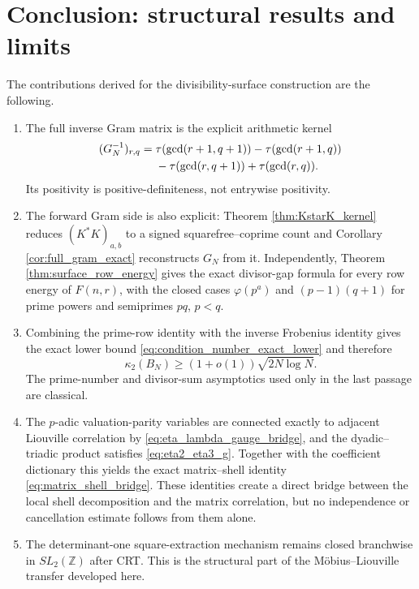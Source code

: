 \documentclass[11pt]{amsart}
\numberwithin{equation}{section}
\theoremstyle{plain}
\theoremstyle{definition}
\theoremstyle{remark}
\newcommand{\Z}{\mathbb Z}
\begin{document}
\section{Conclusion: structural results and limits}
\label{sec:conclusion}

The contributions derived for the divisibility-surface construction are the following.
\begin{enumerate}[label=(\roman*)]
\item The full inverse Gram matrix is the explicit arithmetic kernel
\begin{align}
(G_N^{-1})_{r,q}
={}&\tau(\gcd(r+1,q+1))-\tau(\gcd(r+1,q))\notag\\
&-\tau(\gcd(r,q+1))+\tau(\gcd(r,q)).
\label{eq:conclusion_gram_gcd}
\end{align}
Its positivity is positive-definiteness, not entrywise positivity.

\item The forward Gram side is also explicit: Theorem \ref{thm:KstarK_kernel} reduces $(K^*K)_{a,b}$ to a signed squarefree--coprime count and Corollary \ref{cor:full_gram_exact} reconstructs $G_N$ from it.  Independently, Theorem \ref{thm:surface_row_energy} gives the exact divisor-gap formula for every row energy of $F(n,r)$, with the closed cases $\varphi(p^a)$ and $(p-1)(q+1)$ for prime powers and semiprimes $pq$, $p<q$.

\item Combining the prime-row identity with the inverse Frobenius identity gives the exact lower bound \eqref{eq:condition_number_exact_lower} and therefore
\begin{equation}
\kappa_2(B_N)\ge(1+o(1))\sqrt{2N\log N}.
\label{eq:conclusion_condition_number}
\end{equation}
The prime-number and divisor-sum asymptotics used only in the last passage are classical.

\item The $p$-adic valuation-parity variables are connected exactly to adjacent Liouville correlation by \eqref{eq:eta_lambda_gauge_bridge}, and the dyadic--triadic product satisfies \eqref{eq:eta2_eta3_g}.  Together with the coefficient dictionary this yields the exact matrix--shell identity \eqref{eq:matrix_shell_bridge}.  These identities create a direct bridge between the local shell decomposition and the matrix correlation, but no independence or cancellation estimate follows from them alone.

\item The determinant-one square-extraction mechanism remains closed branchwise in $SL_2(\Z)$ after CRT.  This is the structural part of the Möbius--Liouville transfer developed here.


\end{enumerate}
\end{document}
